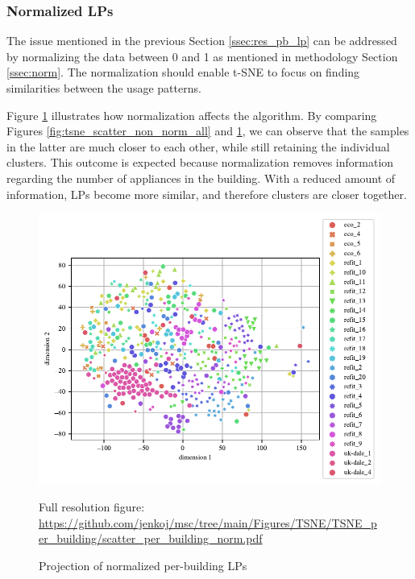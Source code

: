 \subsubsection{Normalized LPs}

The issue mentioned in the previous Section \ref{ssec:res_pb_lp} can be addressed by normalizing the data between 0 and 1 as mentioned in methodology Section \ref{ssec:norm}.
The normalization should enable t-SNE to focus on finding similarities between the usage patterns.

Figure \ref{fig:tsne_pb_scatter_all_all} illustrates how normalization affects the algorithm.
By comparing Figures \ref{fig:tsne_scatter_non_norm_all} and \ref{fig:tsne_pb_scatter_all_all}, we can observe that the samples in the latter are much closer to each other, while still retaining the individual clusters.
This outcome is expected because normalization removes information regarding the number of appliances in the building.
With a reduced amount of information, LPs become more similar, and therefore clusters are closer together.

\begin{figure}[H]
	\centering
	\caption{Projection of normalized per-building LPs}
	\includegraphics[]{Figures/TSNE/TSNE_per_building/scatter_per_building_norm.pdf}
	\label{fig:tsne_pb_scatter_all_all}
	\par
	\par\footnotesize{Full resolution figure: \url{https://github.com/jenkoj/msc/tree/main/Figures/TSNE/TSNE_per_building/scatter_per_building_norm.pdf}}
\end{figure}

